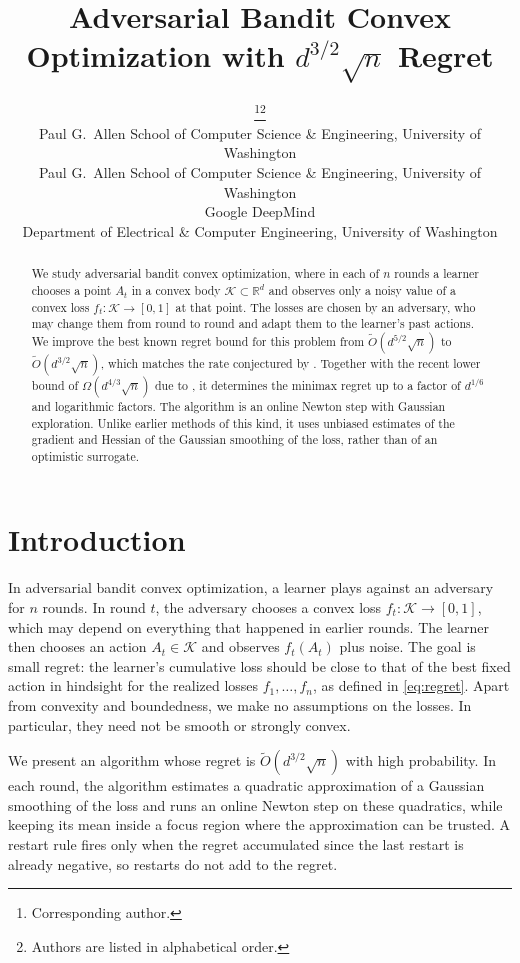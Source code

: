 \documentclass[12pt,cleveref]{jmlr}
\title[Adversarial Bandit Convex Optimization]
{Adversarial Bandit Convex Optimization with \texorpdfstring{$d^{3/2}\sqrt{n}$}{d\^{}(3/2) sqrt(n)} Regret}
\author{%
    \Name{Alireza Bakhtiari}\thanks{Corresponding author.}\thanks{Authors
    are listed in alphabetical order.}
    \Email{alirezaa@cs.washington.edu}\\
    \addr Paul G.\ Allen School of Computer Science \& Engineering,
    University of Washington
    \AND
    \Name{Kevin Jamieson} \Email{jamieson@cs.washington.edu}\\
    \addr Paul G.\ Allen School of Computer Science \& Engineering,
    University of Washington
    \AND
    \Name{Tor Lattimore} \Email{lattimore@google.com}\\
    \addr Google DeepMind
    \AND
    \Name{Lillian Ratliff} \Email{ratliffl@uw.edu}\\
    \addr Department of Electrical \& Computer Engineering,
    University of Washington
}
\newcommand{\R}{\mathbb R}
\newcommand{\K}{\mathcal K}
\newcommand{\1}{\mathbf 1}
\begin{document}
\maketitle

\begin{abstract}
    We study adversarial bandit convex optimization, where in each of $n$ rounds a learner chooses a point $A_t$ in a convex body $\K\subset\R^d$ and observes only a noisy value of a convex loss $f_t:\K\to[0,1]$ at that point. The losses are chosen by an adversary, who may change them from round to round and adapt them to the learner's past actions.
    We improve the best known regret bound for this problem from $\widetilde O(d^{5/2}\sqrt n)$ \citep{lattimore2020improved,lattimore2026bandit} to $\widetilde O(d^{3/2}\sqrt n)$, which matches the rate conjectured by \citet{bubeck2017kernel}.
    Together with the recent lower bound of $\Omega(d^{4/3}\sqrt n)$ due to
    \citet{rajaraman2026price}, it determines the minimax regret up to a
    factor of $d^{1/6}$ and logarithmic factors.
    The algorithm is an online Newton step with Gaussian exploration.
    Unlike earlier methods of this kind, it uses unbiased estimates of the
    gradient and Hessian of the Gaussian smoothing of the loss, rather than
    of an optimistic surrogate.
\end{abstract}

\section{Introduction}
\label{sec:introduction}
In adversarial bandit convex optimization, a learner plays against an adversary for $n$ rounds. In round $t$, the adversary chooses a convex loss $f_t:\K\to[0,1]$, which may depend on everything that happened in earlier rounds. The learner then chooses an action $A_t\in\K$ and observes $f_t(A_t)$ plus noise. The goal is small regret: the learner's cumulative loss should be close to that of the best fixed action in hindsight for the realized losses $f_1,\ldots,f_n$, as defined in \cref{eq:regret}. Apart from convexity and boundedness, we make no assumptions on the losses. In particular, they need not be smooth or strongly convex.

We present an algorithm whose regret is $\widetilde O(d^{3/2}\sqrt n)$ with high probability. In each round, the algorithm estimates a quadratic approximation of a Gaussian smoothing of the loss and runs an online Newton step on these quadratics, while keeping its mean inside a focus region where the approximation can be trusted. A restart rule fires only when the regret accumulated since the last restart is already negative, so restarts do not add to the regret.
\end{document}
